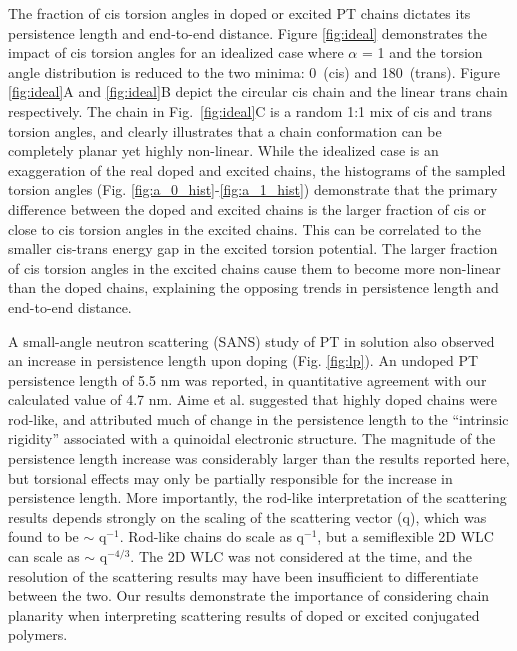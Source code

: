 The fraction of cis torsion angles in doped or excited PT chains dictates its persistence length and end-to-end distance. Figure \ref{fig:ideal} demonstrates the impact of cis torsion angles for an idealized case where $\alpha$ = 1 and the torsion angle distribution is reduced to the two minima: 0\textdegree \ (cis) and 180\textdegree \ (trans). Figure \ref{fig:ideal}A and \ref{fig:ideal}B depict the circular cis chain and the linear trans chain respectively. The chain in Fig.~\ref{fig:ideal}C is a random 1:1 mix of cis and trans torsion angles, and clearly illustrates that a chain conformation can be completely planar yet highly non-linear. While the idealized case is an exaggeration of the real doped and excited chains, the histograms of the sampled torsion angles (Fig. \ref{fig:a_0_hist}-\ref{fig:a_1_hist}) demonstrate that the primary difference between the doped and excited chains is the larger fraction of cis or close to cis torsion angles in the excited chains. This can be correlated to the smaller cis-trans energy gap in the excited torsion potential. The larger fraction of cis torsion angles in the excited chains cause them to become more non-linear than the doped chains, explaining the opposing trends in persistence length and end-to-end distance.

A small-angle neutron scattering (SANS) study of PT in solution also observed an increase in persistence length upon doping (Fig. \ref{fig:lp}).\cite{Aime1989} An undoped PT persistence length of 5.5 nm was reported, in quantitative agreement with our calculated value of 4.7 nm. Aime et al. suggested that highly doped chains were rod-like, and attributed much of change in the persistence length to the ``intrinsic rigidity'' associated with a quinoidal electronic structure. The magnitude of the persistence length increase was considerably larger than the results reported here, but torsional effects may only be partially responsible for the increase in persistence length. More importantly, the rod-like interpretation of the scattering results depends strongly on the scaling of the scattering vector (q), which was found to be $\sim$ q$^{-1}$. Rod-like chains do scale as q$^{-1}$,\cite{Pedersen1997} but a semiflexible 2D WLC can scale as $\sim$ q$^{-4/3}$.\cite{Cifra2008} The 2D WLC was not considered at the time, and the resolution of the scattering results may have been insufficient to differentiate between the two. Our results demonstrate the importance of considering chain planarity when interpreting scattering results of doped or excited conjugated polymers.

